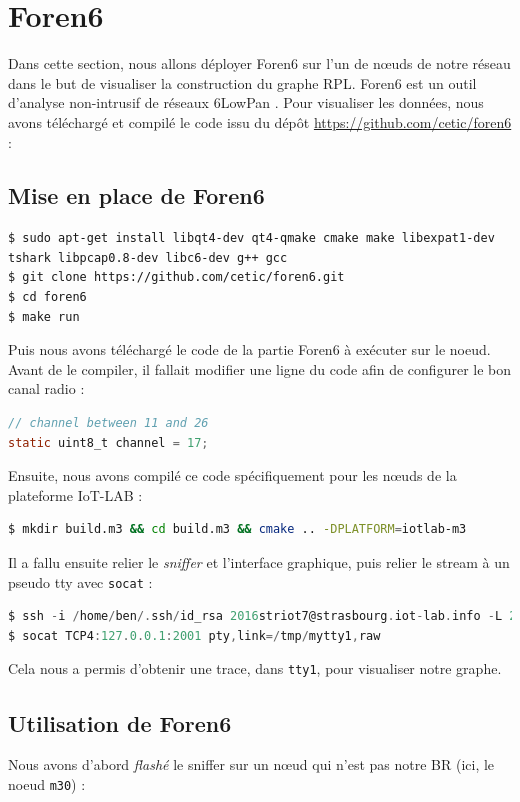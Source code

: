 \documentclass[	DIV=calc,%
							paper=a4,%
							fontsize=11pt,%
			  ]{scrartcl}	 					%
\begin{document}
\section{Foren6}
Dans cette section, nous allons déployer Foren6 sur l'un de nœuds de notre réseau dans le but de visualiser la construction du graphe RPL. Foren6 est un outil d'analyse non-intrusif de réseaux 6LowPan .
Pour visualiser les données, nous avons téléchargé et compilé le code issu du dépôt \url{https://github.com/cetic/foren6} :
\subsection{Mise en place de Foren6}
\begin{lstlisting}
$ sudo apt-get install libqt4-dev qt4-qmake cmake make libexpat1-dev tshark libpcap0.8-dev libc6-dev g++ gcc
$ git clone https://github.com/cetic/foren6.git
$ cd foren6
$ make run
\end{lstlisting}

Puis nous avons téléchargé le code de la partie Foren6 à exécuter sur le noeud. Avant de le compiler, il fallait modifier une ligne du code afin de configurer le bon canal radio :
\begin{lstlisting}[language=C]
// channel between 11 and 26
static uint8_t channel = 17;
\end{lstlisting}
Ensuite, nous avons compilé ce code spécifiquement pour les nœuds de la plateforme IoT-LAB :
\begin{lstlisting}[language=bash]
$ mkdir build.m3 && cd build.m3 && cmake .. -DPLATFORM=iotlab-m3
\end{lstlisting}

Il a fallu ensuite relier le \textit{sniffer} et l'interface graphique, puis relier le stream à un pseudo tty avec \texttt{socat} :

\begin{lstlisting}[language=C]
$ ssh -i /home/ben/.ssh/id_rsa 2016striot7@strasbourg.iot-lab.info -L 2001:m3-34:20000
$ socat TCP4:127.0.0.1:2001 pty,link=/tmp/mytty1,raw
\end{lstlisting}

Cela nous a permis d'obtenir une trace, dans \texttt{tty1}, pour visualiser notre graphe.

\subsection{Utilisation de Foren6}
Nous avons d'abord \textit{flashé} le sniffer sur un nœud qui n'est pas notre BR (ici, le noeud \texttt{m30}) :
\end{document}
